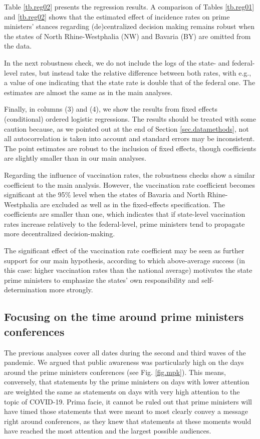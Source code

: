 \documentclass[12pt, abstract=true]{scrartcl}
\begin{document}


Table \ref{tb.reg02} presents the regression results. A comparison of Tables \ref{tb.reg01} and \ref{tb.reg02} shows that the estimated effect of incidence rates on prime ministers’ stances regarding (de)centralized decision making remains robust when the states of North Rhine-Westphalia (NW) and Bavaria (BY) are omitted from the data.

In the next robustness check, we do not include the logs of the state- and federal-level rates, but instead take the relative difference between both rates, with e.g., a value of one indicating that the state rate is double that of the federal one. The estimates are almost the same as in the main analyses.  

Finally, in columns (3) and (4), we show the results from fixed effects (conditional) ordered logistic regressions. The results should be treated with some caution because, as we pointed out at the end of Section \ref{sec.datamethods}, not all autocorrelation is taken into account and standard errors may be inconsistent. The point estimates are robust to the inclusion of fixed effects, though coefficients are slightly smaller than in our main analyses.

Regarding the influence of vaccination rates, the robustness checks show a similar coefficient to the main analysis. However, the vaccination rate coefficient becomes significant at the 95\% level when the states of Bavaria and North Rhine-Westphalia are excluded as well as in the fixed-effects specification. The coefficients are smaller than one, which indicates that if state-level vaccination rates increase relatively to the federal-level, prime ministers tend to propagate more decentralized decision-making.

The significant effect of the vaccination rate coefficient may be seen as further support for our main hypothesis, according to which above-average success (in this case: higher vaccination rates than the national average) motivates the state prime ministers to emphasize the states' own responsibility and self-determination more strongly. 	

\subsection{Focusing on the time around prime ministers conferences}
The previous analyses cover all dates during the second and third waves of the pandemic. We argued that public awareness was particularly high on the days around the prime ministers conferences (see Fig. \ref{fig.mpk}). This means, conversely, that statements by the prime ministers on days with lower attention are weighted the same as statements on days with very high attention to the topic of COVID-19. Prima facie, it cannot be ruled out that prime ministers will have timed those statements that were meant to most clearly convey a message right around conferences, as they knew that statements at these moments would have reached the most attention and the largest possible audiences.
\end{document}

